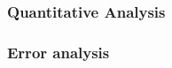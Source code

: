 \subsubsection{Quantitative Analysis}\label{quantitative}


\subsubsection{Error analysis}\label{error}

